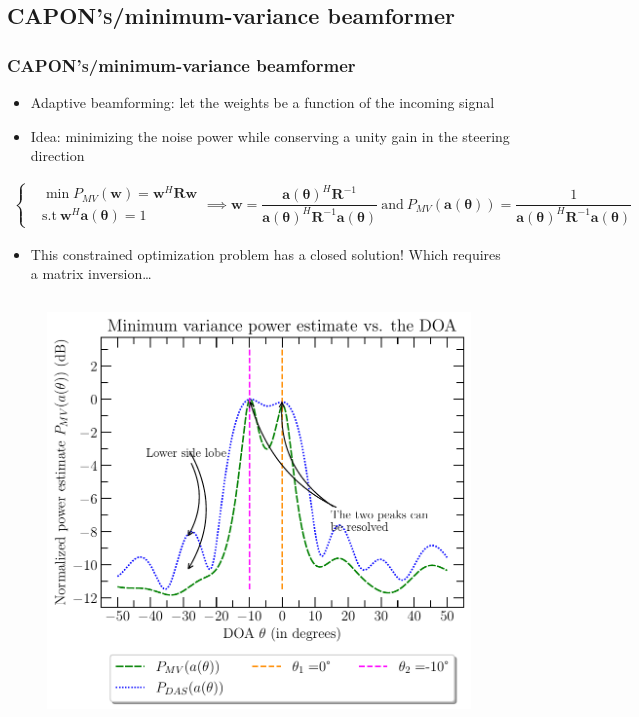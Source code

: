 \documentclass[UKenglish,8pt,aspectratio=1610]{beamer}
\begin{document}
	\subsection{\textsc{CAPON's}/minimum-variance beamformer}
	\begin{frame}
		\frametitle{\textsc{CAPON's}/minimum-variance beamformer \cite{twoDecades,uncini,Johnson1993ArraySP}}
		\begin{itemize}
			\item Adaptive beamforming: let the weights be a function of the incoming signal 
			\item Idea: minimizing the noise power while conserving a unity gain in the steering direction
		\end{itemize}
	\begin{align*}
		\left\{ \begin{aligned}
			&\min P_{MV}(\mathbf{w})=\mathbf{w}^H\mathbf{R}\mathbf{w}\\
			&\text{s.t}~\mathbf{w}^H\mathbf{a(\theta)}=1
		\end{aligned}\right.\implies
		\mathbf{w}=\dfrac{\mathbf{a(\theta)}^H\mathbf{R}^{-1}}{\mathbf{a(\theta)}^H\mathbf{R}^{-1}\mathbf{a(\theta)}}
	~\text{and}~P_{MV}(\mathbf{a(\theta)})=\dfrac{1}{\mathbf{a(\theta)}^H\mathbf{R}^{-1}\mathbf{a(\theta)}}
	\end{align*}
\begin{itemize}
	\item This constrained optimization problem has a closed solution! Which requires a matrix inversion\dots
\end{itemize}
	\begin{columns}
	\begin{column}{0.5\textwidth}
		\begin{figure}[h!]
			\vspace{-15pt}
			\centering
			\includegraphics[scale=0.4]{question3/part_A_question_3_minimum_variance_spectrum_estimate.pdf}

\end{figure}
\end{column}
\end{columns}
\end{frame}
\end{document}
